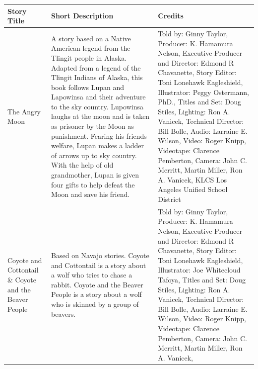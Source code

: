 \begin{table}[h]
    \centering
    \begin{small}

        \begin{tabular}{|p{1.5cm}|p{8.5cm}|p{7cm}|}
            \hline
            \textbf{Story Title} & \textbf{Short Description} & \textbf{Credits} \\
            \hline
            The Angry Moon
                                 &
            A story based on a Native American legend from the Tlingit people in Alaska.
            Adapted from a legend of the Tlingit Indians of Alaska, this book follows Lupan and Lapowinsa and their adventure to the sky country.
            Lupowinsa laughs at the moon and is taken as prisoner by the Moon as punishment.
            Fearing his friends welfare, Lupan makes a ladder of arrows up to sky country.
            With the help of old grandmother, Lupan is given four gifts to help defeat the Moon and save his friend.
                                 &
            Told by: Ginny Taylor,
            Producer: K. Hamamura Nelson,
            Executive Producer and Director: Edmond R Chavanette,
            Story Editor: Toni Lonehawk Eagleshield,
            Illustrator: Peggy Ostermann, PhD.,
            Titles and Set: Doug Stiles,
            Lighting: Ron A. Vanicek,
            Technical Director: Bill Bolle,
            Audio: Larraine E. Wilson,
            Video: Roger Knipp,
            Videotape: Clarence Pemberton,
            Camera: John C. Merritt, Martin Miller, Ron A. Vanicek,
            KLCS Los Angeles Unified School District
            \\
            \hline
            Coyote and Cottontail \& Coyote and the Beaver People
                                 &
            Based on Navajo stories.
            Coyote and Cottontail is a story about a wolf who tries to chase a rabbit.
            Coyote and the Beaver People is a story about a wolf who is skinned by a group of beavers.
                                 &
            Told by: Ginny Taylor,
            Producer: K. Hamamura Nelson,
            Executive Producer and Director: Edmond R Chavanette,
            Story Editor: Toni Lonehawk Eagleshield,
            Illustrator: Joe Whitecloud Tafoya,
            Titles and Set: Doug Stiles,
            Lighting: Ron A. Vanicek,
            Technical Director: Bill Bolle,
            Audio: Larraine E. Wilson,
            Video: Roger Knipp,
            Videotape: Clarence Pemberton,
            Camera: John C. Merritt, Martin Miller, Ron A. Vanicek,

\end{tabular}
\end{small}
\end{table}

